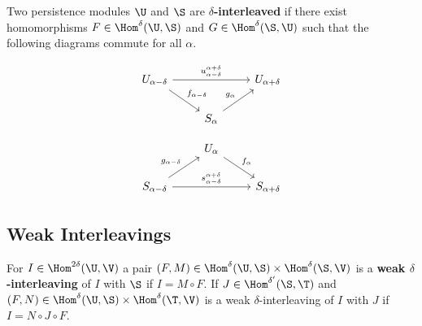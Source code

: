 \begin{definition}[Interleaving]
  Two persistence modules $\U$ and $\S$ are \textbf{$\delta$-interleaved} if there exist homomorphisms $F\in\Hom^\delta(\U, \S)$ and $G \in\Hom^\delta(\S,\U)$ such that the following diagrams commute for all $\alpha$.

  \begin{minipage}{0.45\textwidth}
  \begin{equation}\label{dgm:interleaving1}
    \begin{tikzcd}
      U_{\alpha-\delta}\arrow{rr}{u_{\alpha-\delta}^{\alpha+\delta}}\arrow{dr}{f_{\alpha-\delta}} & &
      U_{\alpha+\delta}\\
      & S_{\alpha}\arrow{ur}{g_\alpha} &
  \end{tikzcd}\end{equation}
  \end{minipage}
  \begin{minipage}{0.45\textwidth}
  \begin{equation}\label{dgm:interleaving2}
    \begin{tikzcd}
      & U_{\alpha}\arrow{dr}{f_\alpha} &\\
      S_{\alpha-\delta}\arrow{rr}{s_{\alpha-\delta}^{\alpha+\delta}}\arrow{ur}{g_{\alpha-\delta}} & &
      S_{\alpha+\delta}
  \end{tikzcd}\end{equation}
  \end{minipage}
\end{definition}

\subsection{Weak Interleavings}

\begin{definition}
  For $I\in\Hom^{2\delta}(\U,\V)$ a pair $(F, M)\in \Hom^\delta(\U,\S)\times\Hom^\delta(\S,\V)$ is a \textbf{weak $\delta$-interleaving} of $I$ with $\S$ if $I = M\circ F$.
  If $J\in\Hom^{\delta'}(\S,\T)$ and $(F,N)\in\Hom^\delta(\U,\S)\times\Hom^\delta(\T,\V)$ is a weak $\delta$-interleaving of $I$ with $J$ if $I = N\circ J\circ F$.
\end{definition}

